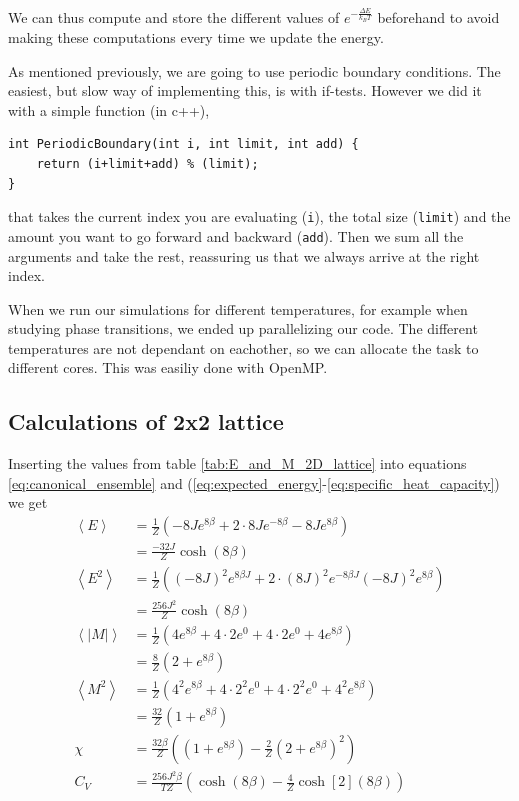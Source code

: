 \documentclass[reprint, english,notitlepage,nofootinbib]{revtex4-1}  %
\begin{document}
We can thus compute and store the different values of $e^{- \frac{\Delta E}{k_BT}}$ beforehand to avoid making these computations every time we update the energy.

As mentioned previously, we are going to use periodic boundary conditions. The easiest, but slow way of implementing this, is with if-tests. However we did it with a simple function (in c++),
\begin{lstlisting}
int PeriodicBoundary(int i, int limit, int add) {
	return (i+limit+add) % (limit);
}
\end{lstlisting}
that takes the current index you are evaluating (\texttt{i}), the total size (\texttt{limit}) and the amount you want to go forward and backward (\texttt{add}). Then we sum all the arguments and take the rest, reassuring us that we always arrive at the right index.

When we run our simulations for different temperatures, for example when studying phase transitions, we ended up parallelizing our code. The different temperatures are not dependant on eachother, so we can allocate the task to different cores. This was easiliy done with OpenMP.

\subsection{Calculations of 2x2 lattice} \label{calc_of_22_lattice}

Inserting the values from table \ref{tab:E_and_M_2D_lattice} into equations \eqref{eq:canonical_ensemble} and (\ref{eq:expected_energy}-\ref{eq:specific_heat_capacity}) we get
\begin{align*}
	\left<E\right> &= \frac{1}{Z}\left(-8Je^{8\beta} + 2\cdot 8Je^{-8\beta } - 8J e^{8\beta }\right) \\
	&= \frac{-32J}{Z}\cosh(8\beta )\\
	\left<E^2\right> &= \frac{1}{Z}\left((-8J)^2e^{8\beta J} + 2\cdot (8J)^2e^{-8\beta J} (- 8J)^2 e^{8\beta }\right) \\
	&= \frac{256J^2}{Z}\cosh(8\beta)\\
	\left<|M|\right> &= \frac{1}{Z}\left(4e^{8\beta } + 4\cdot 2e^{0} + 4\cdot 2 e^{0} + 4e^{8\beta }\right) \\
	&= \frac{8}{Z}\left(2 + e^{8\beta }\right)\\
	\left<M^2\right> &= \frac{1}{Z}\left(4^2e^{8\beta } + 4\cdot 2^2e^{0} + 4\cdot 2^2 e^{0} + 4^2e^{8\beta }\right) \\
	&= \frac{32}{Z}\left(1 + e^{8\beta }\right)\\
	\chi &= \frac{32\beta}{Z}\left(\left(1 + e^{8\beta }\right) - \frac{2}{Z}\left(2 + e^{8\beta }\right)^2 \right)\\
	C_V &= \frac{256J^2\beta}{TZ}\left(\cosh(8\beta) - \frac{4}{Z}\cosh[2](8\beta)\right)
\end{align*}
\end{document}
